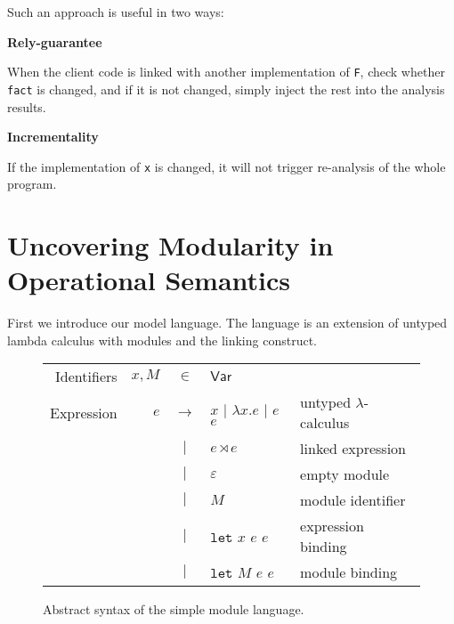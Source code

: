 \documentclass[acmsmall,screen,review]{acmart}\settopmatter{printfolios=true,printccs=false,printacmref=false}
\newcommand*{\vbar}{|}
\newcommand*{\ExprVar}{\mathsf{Var}}
\newcommand*{\link}[2]{{#1}\rtimes{#2}}
\newcommand*{\Let}{\mathtt{let}}
\begin{document}
Such an approach is useful in two ways:

\noindent\textbf{Rely-guarantee}

When the client code is linked with another implementation of \texttt{F}, check whether \texttt{fact} is changed, and if it is not changed, simply inject the rest into the analysis results.

\noindent\textbf{Incrementality}

If the implementation of \texttt{x} is changed, it will not trigger re-analysis of the whole program.

\section{Uncovering Modularity in Operational Semantics}
First we introduce our model language.
The language is an extension of untyped lambda calculus with modules and the linking construct.
\begin{figure}[h!]
  \footnotesize
  \centering
  \begin{tabular}{rrcll}
    Identifiers & $x,M$ & $\in$         & $\ExprVar$                                                             \\
    Expression  & $e$   & $\rightarrow$ & $x$ $\vbar$ $\lambda x.e$ $\vbar$ $e$ $e$ & untyped $\lambda$-calculus \\
                &       & $\vbar$       & $\link{e}{e}$                             & linked expression          \\
                &       & $\vbar$       & $\varepsilon$                             & empty module               \\
                &       & $\vbar$       & $M$                                       & module identifier          \\
                &       & $\vbar$       & $\Let$ $x$ $e$ $e$                        & expression binding         \\
                &       & $\vbar$       & $\Let$ $M$ $e$ $e$                        & module binding             \\
  \end{tabular}
  \caption{Abstract syntax of the simple module language.}
  \label{fig:syntax}
\end{figure}
\end{document}
